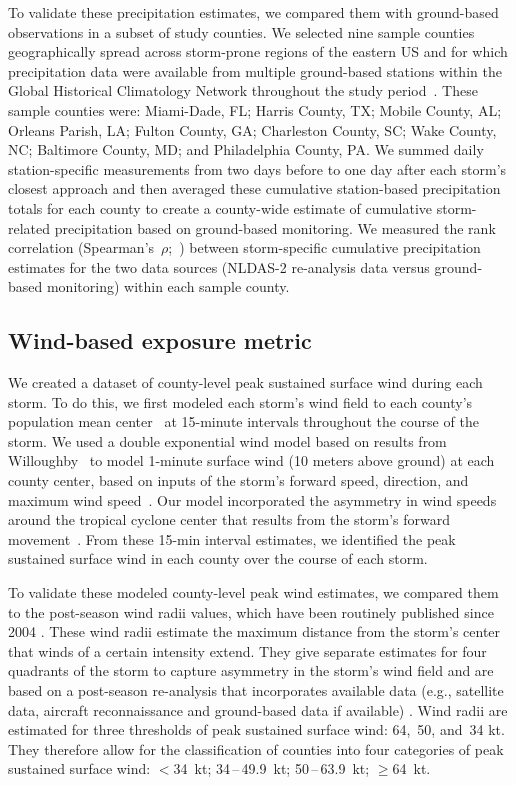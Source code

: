 To validate these precipitation estimates, we compared them with ground-based
observations in a subset of study counties. We selected nine sample counties
geographically spread across storm-prone regions of the eastern \ac{US} and for
which precipitation data were available from multiple ground-based stations
within the Global Historical Climatology Network throughout the study
period~\parencite{menne2012overview, rnoaa, countyweather}. These sample
counties were: Miami-Dade, FL; Harris County, TX; Mobile County, AL; Orleans
Parish, LA; Fulton County, GA; Charleston County, SC; Wake County, NC;
Baltimore County, MD; and Philadelphia County, PA. We summed daily
station-specific measurements from two days before to one day after each
storm's closest approach and then averaged these cumulative station-based
precipitation totals for each county to create a county-wide estimate of
cumulative storm-related precipitation based on ground-based monitoring. We
measured the rank correlation (Spearman's~$\rho$;~\textcite{spearman1904proof})
between storm-specific cumulative precipitation estimates for the two data
sources (\ac{NLDAS-2} re-analysis data versus ground-based monitoring) within
each sample county.

\subsection*{Wind-based exposure metric}

We created a dataset of county-level peak sustained surface wind during each
storm. To do this, we first modeled each storm's wind field to each county's
population mean center~\parencite{countycenters} at 15-minute intervals
throughout the course of the storm. We used a double exponential wind model
based on results from Willoughby~\parencite{willoughby2006parametric} to model
1-minute surface wind (10 meters above ground) at each county center, based on
inputs of the storm's forward speed, direction, and maximum wind
speed~\parencite{stormwindmodel}. Our model incorporated the asymmetry in wind
speeds around the tropical cyclone center that results from the storm's forward
movement~\parencite{phadke2003modeling}.  From these 15-\si{\minute} interval
estimates, we identified the peak sustained surface wind in each county over
the course of each storm.

To validate these modeled county-level peak wind estimates, we compared them
to the  post-season wind radii values, which have been routinely published
since 2004 \parencite{knaff2016using}. These wind radii estimate the maximum
distance from the storm's center that winds of a certain intensity extend. They
give separate estimates for four quadrants of the storm to capture asymmetry in
the storm's wind field and are based on a post-season re-analysis that
incorporates available data (e.g., satellite data, aircraft reconnaissance and
ground-based data if available) \parencite{knaff2016using}. Wind radii are
estimated for three thresholds of peak sustained surface wind: 64,~50, and~34
kt.  They therefore allow for the classification of counties into four
categories of peak sustained surface wind: $<$34~kt; 34\,--\,49.9~kt;
50\,--\,63.9~kt; $\ge$64~kt. 

